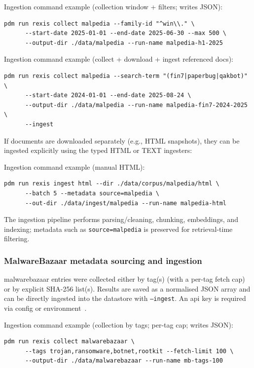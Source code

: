 Ingestion command example (collection window + filters; writes JSON):
\begin{verbatim}
pdm run rexis collect malpedia --family-id "^win\\." \
      --start-date 2025-01-01 --end-date 2025-06-30 --max 500 \
      --output-dir ./data/malpedia --run-name malpedia-h1-2025
\end{verbatim}

Ingestion command example (collect + download + ingest referenced docs):
\begin{verbatim}
pdm run rexis collect malpedia --search-term "(fin7|paperbug|qakbot)" \
      --start-date 2024-01-01 --end-date 2025-08-24 \
      --output-dir ./data/malpedia --run-name malpedia-fin7-2024-2025 \
      --ingest
\end{verbatim}

If documents are downloaded separately (e.g., HTML snapshots), they can be ingested explicitly
using the typed HTML or TEXT ingesters:

Ingestion command example (manual HTML):
\begin{verbatim}
pdm run rexis ingest html --dir ./data/corpus/malpedia/html \
      --batch 5 --metadata source=malpedia \
      --out-dir ./data/ingest/malpedia --run-name malpedia-html
\end{verbatim}

The ingestion pipeline performs parsing/cleaning, chunking, embeddings, and indexing; metadata such
as \texttt{source=malpedia} is preserved for retrieval-time filtering.

\subsubsection{MalwareBazaar metadata sourcing and ingestion}\label{subsubsec:MalwareBazaarIngestionExec}
\gls{malwarebazaar} entries were collected either by tag(s) (with a per-tag fetch cap) or by explicit
SHA-256 list(s). Results are saved as a normalised JSON array and can be directly ingested into the
datastore with \texttt{--ingest}. An \gls{api} key is required via config or
environment~\cite{rexisDataSourcingMB}.

Ingestion command example (collection by tags; per-tag cap; writes JSON):
\begin{verbatim}
pdm run rexis collect malwarebazaar \
      --tags trojan,ransomware,botnet,rootkit --fetch-limit 100 \
      --output-dir ./data/malwarebazaar --run-name mb-tags-100
\end{verbatim}

